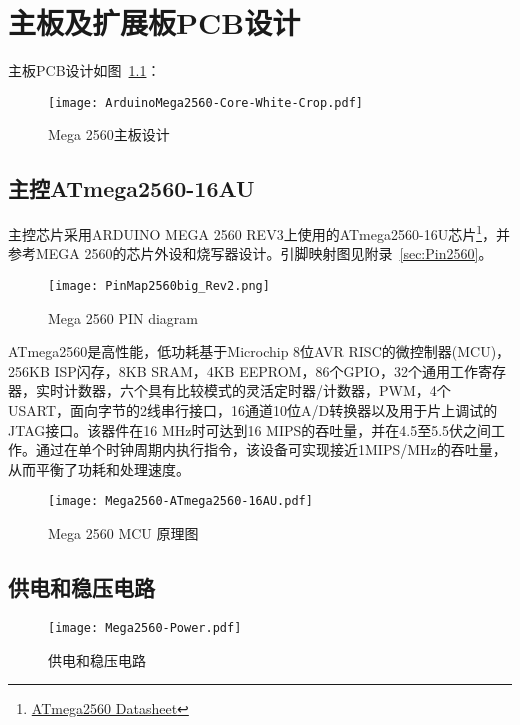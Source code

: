 \chapter{主板及扩展板PCB设计}
\label{cha:PCB}

主板PCB设计如图~\ref{fig:CorePCB}：

\begin{figure}[htbp]
    \centering
    \texttt{[image: ArduinoMega2560-Core-White-Crop.pdf]}
    \caption{Mega 2560主板设计}
    \label{fig:CorePCB}
\end{figure}

\section{主控ATmega2560-16AU}

主控芯片采用ARDUINO MEGA 2560 REV3\cite{arduino_mega-2560-r3}上使用的ATmega2560-16U芯片\footnote{\href{http://www.atmel.com/Images/Atmel-2549-8-bit-AVR-Microcontroller-ATmega640-1280-1281-2560-2561_datasheet.pdf}{ATmega2560 Datasheet}}，并参考MEGA 2560的芯片外设和烧写器设计。引脚映射图见附录~\ref{sec:Pin2560}。

\begin{figure}[htbp]
    \centering
    \texttt{[image: PinMap2560big\_Rev2.png]}
    \caption{Mega 2560 PIN diagram}
    \label{fig:PinMap2560}
\end{figure}

ATmega2560是高性能，低功耗基于Microchip 8位AVR RISC的微控制器(MCU)，256KB ISP闪存，8KB SRAM，4KB EEPROM，86个GPIO，32个通用工作寄存器，实时计数器，六个具有比较模式的灵活定时器/计数器，PWM，4个USART，面向字节的2线串行接口，16通道10位A/D转换器以及用于片上调试的JTAG接口。该器件在16 MHz时可达到16 MIPS的吞吐量，并在4.5至5.5伏之间工作。通过在单个时钟周期内执行指令，该设备可实现接近1MIPS/MHz的吞吐量，从而平衡了功耗和处理速度。

\begin{figure}[htbp]
    \centering
    \texttt{[image: Mega2560-ATmega2560-16AU.pdf]}
    \caption{Mega 2560 MCU 原理图}
    \label{fig:Mega2560-ATmega2560-16AU}
\end{figure}

\section{供电和稳压电路}

\begin{figure}[htbp]
    \centering
    \texttt{[image: Mega2560-Power.pdf]}
    \caption{供电和稳压电路}
    \label{fig:Mega2560-Power}
\end{figure}

